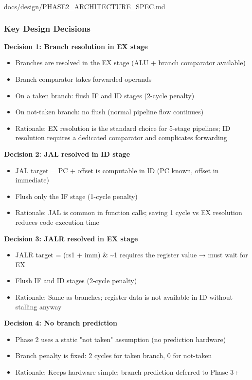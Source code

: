 \begin{relocated}{docs/design/PHASE2_ARCHITECTURE_SPEC.md}
\subsubsection{Key Design Decisions}\label{ds:ch:phase2-architecture:24-key-design-decisions}

\textbf{Decision 1: Branch resolution in EX stage}

\begin{itemize}
\tightlist
\item
  Branches are resolved in the EX stage (ALU + branch comparator
  available)
\item
  Branch comparator takes forwarded operands
\item
  On a taken branch: flush IF and ID stages (2-cycle penalty)
\item
  On not-taken branch: no flush (normal pipeline flow continues)
\item
  Rationale: EX resolution is the standard choice for 5-stage pipelines;
  ID resolution requires a dedicated comparator and complicates
  forwarding
\end{itemize}

\textbf{Decision 2: JAL resolved in ID stage}

\begin{itemize}
\tightlist
\item
  JAL target = PC + offset is computable in ID (PC known, offset in
  immediate)
\item
  Flush only the IF stage (1-cycle penalty)
\item
  Rationale: JAL is common in function calls; saving 1 cycle vs EX
  resolution reduces code execution time
\end{itemize}

\textbf{Decision 3: JALR resolved in EX stage}

\begin{itemize}
\tightlist
\item
  JALR target = (rs1 + imm) \& \textasciitilde1 requires the register
  value → must wait for EX
\item
  Flush IF and ID stages (2-cycle penalty)
\item
  Rationale: Same as branches; register data is not available in ID
  without stalling anyway
\end{itemize}

\textbf{Decision 4: No branch prediction}

\begin{itemize}
\tightlist
\item
  Phase 2 uses a static "not taken" assumption (no prediction hardware)
\item
  Branch penalty is fixed: 2 cycles for taken branch, 0 for not-taken
\item
  Rationale: Keeps hardware simple; branch prediction deferred to Phase
  3+
\end{itemize}


\end{relocated}
